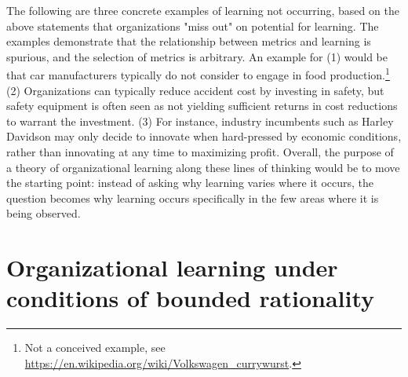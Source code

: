 \documentclass[12pt, man, natbib]{apa6}
\begin{document}
	The following are three concrete examples of learning not occurring, based on the above statements that organizations "miss out" on potential for learning. The examples demonstrate that the relationship between metrics and learning is spurious, and the selection of metrics is arbitrary. An example for (1) would be that car manufacturers typically do not consider to engage in food production.\footnote{Not a conceived example, see \url{https://en.wikipedia.org/wiki/Volkswagen\_currywurst}.} (2) Organizations can typically reduce accident cost by investing in safety, but safety equipment is often seen as not yielding sufficient returns in cost reductions to warrant the investment. (3) For instance, industry incumbents such as Harley Davidson may only decide to innovate when hard-pressed by economic conditions, rather than innovating at any time to maximizing profit. Overall, the purpose of a theory of organizational learning along these lines of thinking would be to move the starting point: instead of asking why learning varies where it occurs, the question becomes why learning occurs specifically in the few areas where it is being observed.
	
	\section{Organizational learning under conditions of bounded rationality}
	
	
	

%	
%	
	
	


\end{document}
